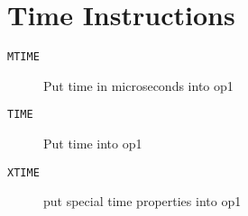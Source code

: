 \section{Time Instructions}
\begin{description}
\item[\texttt{MTIME}]  Put time in microseconds into op1\\

\end{description}
\begin{description}
\item[\texttt{TIME}]  Put time into op1\\

\end{description}
\begin{description}
\item[\texttt{XTIME}]  put special time properties into op1\\

\end{description}
